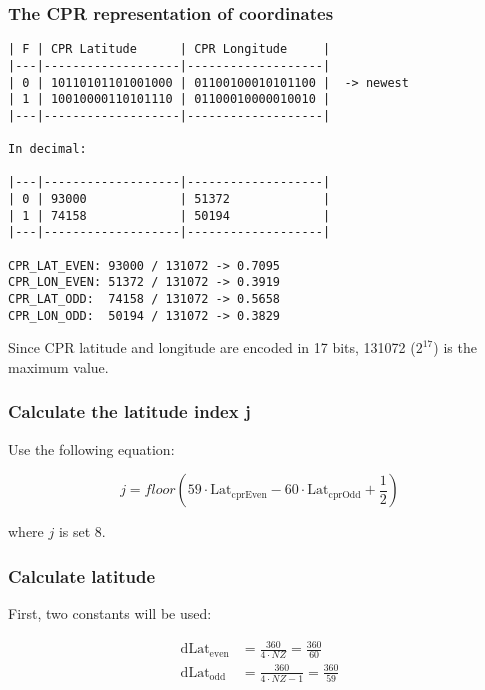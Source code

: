 \subsubsection{The CPR representation of
coordinates}\label{the-cpr-representation-of-coordinates}

\begin{verbatim}
| F | CPR Latitude      | CPR Longitude     |
|---|-------------------|-------------------|
| 0 | 10110101101001000 | 01100100010101100 |  -> newest
| 1 | 10010000110101110 | 01100010000010010 |
|---|-------------------|-------------------|

In decimal:

|---|-------------------|-------------------|
| 0 | 93000             | 51372             |
| 1 | 74158             | 50194             |
|---|-------------------|-------------------|

CPR_LAT_EVEN: 93000 / 131072 -> 0.7095
CPR_LON_EVEN: 51372 / 131072 -> 0.3919
CPR_LAT_ODD:  74158 / 131072 -> 0.5658
CPR_LON_ODD:  50194 / 131072 -> 0.3829
\end{verbatim}

Since CPR latitude and longitude are encoded in 17 bits, 131072 ($2^17$) is the maximum value.

\subsubsection{Calculate the latitude index j}\label{calculate-the-latitude-index-j}

Use the following equation:

\begin{equation}
  j = floor \left( 59 \cdot \mathrm{Lat}_\mathrm{cprEven} - 60 \cdot \mathrm{Lat}_\mathrm{cprOdd} + \frac{1}{2}  \right)
\end{equation}

\noindent where $j$ is set 8.

\subsubsection{Calculate latitude}\label{calculate-latitude}

First, two constants will be used:

\begin{equation}
  \begin{split}
    \mathrm{dLat}_\mathrm{even} &= \frac{360}{4 \cdot NZ} = \frac{360}{60} \\
    \mathrm{dLat}_\mathrm{odd} &= \frac{360}{4 \cdot NZ - 1}  = \frac{360}{59}
  \end{split}
\end{equation}

